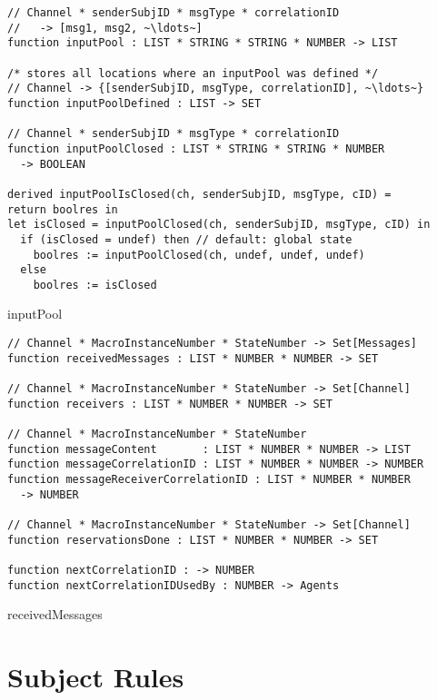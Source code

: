 \begin{listing}[H]
\begin{verbatim}
// Channel * senderSubjID * msgType * correlationID
//   -> [msg1, msg2, ~\ldots~]
function inputPool : LIST * STRING * STRING * NUMBER -> LIST

/* stores all locations where an inputPool was defined */
// Channel -> {[senderSubjID, msgType, correlationID], ~\ldots~}
function inputPoolDefined : LIST -> SET

// Channel * senderSubjID * msgType * correlationID
function inputPoolClosed : LIST * STRING * STRING * NUMBER
  -> BOOLEAN

derived inputPoolIsClosed(ch, senderSubjID, msgType, cID) =
return boolres in
let isClosed = inputPoolClosed(ch, senderSubjID, msgType, cID) in
  if (isClosed = undef) then // default: global state
    boolres := inputPoolClosed(ch, undef, undef, undef)
  else
    boolres := isClosed
\end{verbatim}
\caption{inputPool}
\label{lst:asm:inputPool}
\end{listing}



\begin{listing}[H]
\begin{verbatim}
// Channel * MacroInstanceNumber * StateNumber -> Set[Messages]
function receivedMessages : LIST * NUMBER * NUMBER -> SET

// Channel * MacroInstanceNumber * StateNumber -> Set[Channel]
function receivers : LIST * NUMBER * NUMBER -> SET

// Channel * MacroInstanceNumber * StateNumber
function messageContent       : LIST * NUMBER * NUMBER -> LIST
function messageCorrelationID : LIST * NUMBER * NUMBER -> NUMBER
function messageReceiverCorrelationID : LIST * NUMBER * NUMBER
  -> NUMBER

// Channel * MacroInstanceNumber * StateNumber -> Set[Channel]
function reservationsDone : LIST * NUMBER * NUMBER -> SET

function nextCorrelationID : -> NUMBER
function nextCorrelationIDUsedBy : NUMBER -> Agents
\end{verbatim}
\caption{receivedMessages}
\label{lst:asm:receivedMessages}
\end{listing}




\section{Subject Rules}


